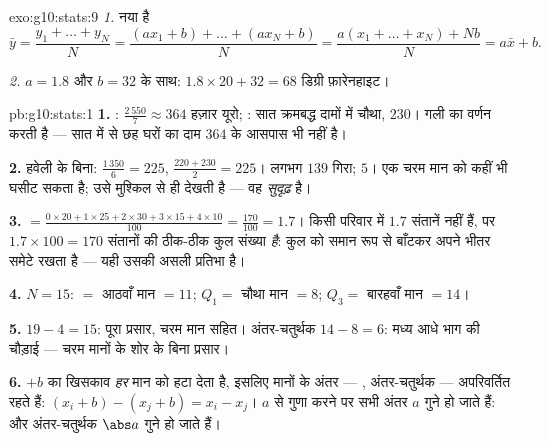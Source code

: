 \begin{solution}{exo:g10:stats:9}
\emph{1.} नया  है
\[
\bar y = \frac{y_1 + \dots + y_N}{N}
= \frac{(a x_1 + b) + \dots + (a x_N + b)}{N}
= \frac{a(x_1 + \dots + x_N) + Nb}{N}
= a \bar x + b .
\]

\emph{2.} $a = 1.8$ और $b = 32$ के साथ:  $1.8 \times 20 + 32 = 68$ डिग्री फ़ारेनहाइट।
\end{solution}

\begin{solution}{pb:g10:stats:1}
\textbf{1.} : $\frac{2\,550}{7} \approx 364$ हज़ार यूरो; : सात क्रमबद्ध दामों में चौथा,
$230$। गली का वर्णन  करती है --- सात में से छह घरों का दाम $364$ के
आसपास भी नहीं है।

\textbf{2.} हवेली के बिना:  $\frac{1\,350}{6} = 225$,  $\frac{220 + 230}{2} = 225$।  लगभग $139$
गिरा;  $5$। एक चरम मान  को कहीं भी घसीट सकता है; 
उसे मुश्किल से ही देखती है --- वह \emph{सुदृढ़} है।

\textbf{3.}  $= \frac{0 \times 20 + 1 \times 25 + 2 \times
30 + 3 \times 15 + 4 \times 10}{100} = \frac{170}{100} = 1.7$। किसी परिवार में $1.7$ संतानें नहीं हैं, पर $1.7 \times 100 = 170$
संतानों की ठीक-ठीक कुल संख्या \emph{है}:  कुल को समान रूप से बाँटकर
अपने भीतर समेटे रखता है --- यही उसकी असली प्रतिभा है।

\textbf{4.} $N = 15$:  $=$ आठवाँ मान $= 11$; $Q_1 =$ चौथा मान $= 8$;
$Q_3 =$ बारहवाँ मान $= 14$।

\textbf{5.}  $19 - 4 = 15$: पूरा प्रसार, चरम मान सहित। अंतर-चतुर्थक  $14 - 8 = 6$:
मध्य आधे भाग की चौड़ाई --- चरम मानों के शोर के बिना प्रसार।

\textbf{6.} $+b$ का खिसकाव \emph{हर} मान को हटा देता है, इसलिए मानों के
अंतर --- , अंतर-चतुर्थक  --- अपरिवर्तित रहते हैं: $(x_i + b) - (x_j + b) = x_i - x_j$। $a$ से
गुणा करने पर सभी अंतर $a$ गुने हो जाते हैं:  और अंतर-चतुर्थक 
$\abs a$ गुने हो जाते हैं।


\end{solution}
